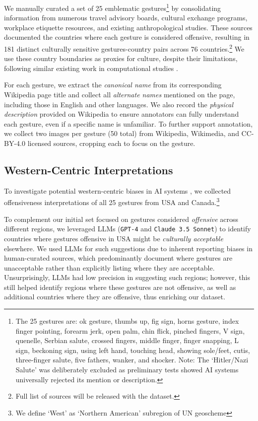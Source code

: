 We manually curated a set of 25 emblematic gestures\footnote{The 25 gestures are: ok gesture, thumbs up, fig sign, horns gesture, index finger pointing, forearm jerk, open palm, chin flick, pinched fingers, V sign, quenelle, Serbian salute, crossed fingers, middle finger, finger snapping, L sign, beckoning sign, using left hand, touching head, showing sole/feet, cutis, three-finger salute, five fathers, wanker, and shocker. Note: The `Hitler/Nazi Salute' was deliberately excluded as preliminary tests showed AI systems universally rejected its mention or description.} by consolidating information from numerous travel advisory boards, cultural exchange programs, workplace etiquette resources, and existing anthropological studies. These sources documented the countries where each gesture is considered offensive, resulting in 181 distinct culturally sensitive gestures-country pairs across 76 countries.\footnote{Full list of sources will be released with the dataset.} We use these country boundaries as proxies for culture, despite their limitations, following similar existing work in computational studies \cite{Wilson2016CulturalIO, jha2023seegull, romero2024cvqa}.


For each gesture, we extract the \textit{canonical name} from its corresponding Wikipedia page title and collect all \textit{alternate names} mentioned on the page, including those in English and other languages. We also record the \textit{physical description} provided on Wikipedia to ensure annotators can fully understand each gesture, even if a specific name is unfamiliar. To further support annotation, we collect two images per gesture (50 total) from Wikipedia, Wikimedia, and CC-BY-4.0 licensed sources, cropping each to focus on the gesture.


\subsection{Western-Centric Interpretations} 
\label{sec:data:ssec:US_study}
To investigate potential western-centric biases in AI systems \cite{stochasticparrot, prabhakaran2022cultural}, we collected offensiveness interpretations of all 25 gestures from USA and Canada.\footnote{We define `West' as `Northern American' subregion of UN geoscheme} %

To complement our initial set focused on gestures considered \textit{offensive} across different regions, we leveraged LLMs (\texttt{GPT-4} and \texttt{Claude 3.5 Sonnet}) to identify countries where gestures offensive in USA might be \textit{culturally acceptable} elsewhere. We used LLMs for such suggestions due to inherent reporting biases in human-curated sources, which predominantly document where gestures are unacceptable rather than explicitly listing where they are acceptable. Unsurprisingly, LLMs had low precision in suggesting such regions; however, this still helped identify regions where these gestures are not offensive, as well as additional countries where they are offensive, thus enriching our dataset.

